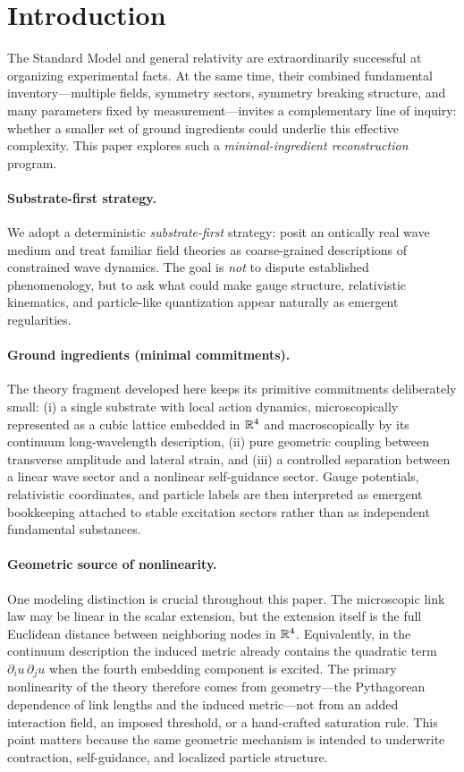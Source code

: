 \section{Introduction}
\label{sec:introduction}

The Standard Model and general relativity are extraordinarily successful at organizing experimental facts.
At the same time, their combined fundamental inventory---multiple fields, symmetry sectors, symmetry breaking
structure, and many parameters fixed by measurement---invites a complementary line of inquiry:
whether a smaller set of ground ingredients could underlie this effective complexity.
This paper explores such a \emph{minimal-ingredient reconstruction} program.

\paragraph{Substrate-first strategy.}
We adopt a deterministic \emph{substrate-first} strategy: posit an ontically real wave medium and treat familiar
field theories as coarse-grained descriptions of constrained wave dynamics.
The goal is \emph{not} to dispute established phenomenology, but to ask what could make gauge structure,
relativistic kinematics, and particle-like quantization appear naturally as emergent regularities.

\paragraph{Ground ingredients (minimal commitments).}
The theory fragment developed here keeps its primitive commitments deliberately small:
(i) a single substrate with local action dynamics, microscopically represented as a cubic lattice embedded in $\mathbb{R}^4$ and
macroscopically by its continuum long-wavelength description,
(ii) pure geometric coupling between transverse amplitude and lateral strain,
and (iii) a controlled separation between a linear wave sector and a nonlinear self-guidance sector.
Gauge potentials, relativistic coordinates, and particle labels are then interpreted as emergent bookkeeping attached to
stable excitation sectors rather than as independent fundamental substances.

\paragraph{Geometric source of nonlinearity.}
One modeling distinction is crucial throughout this paper.
The microscopic link law may be linear in the scalar extension, but the extension itself is the full Euclidean distance
between neighboring nodes in $\mathbb{R}^4$.
Equivalently, in the continuum description the induced metric already contains the quadratic term
$\partial_i u\,\partial_j u$ when the fourth embedding component is excited.
The primary nonlinearity of the theory therefore comes from geometry---the Pythagorean dependence of link lengths and the
induced metric---not from an added interaction field, an imposed threshold, or a hand-crafted saturation rule.
This point matters because the same geometric mechanism is intended to underwrite contraction, self-guidance, and
localized particle structure.

